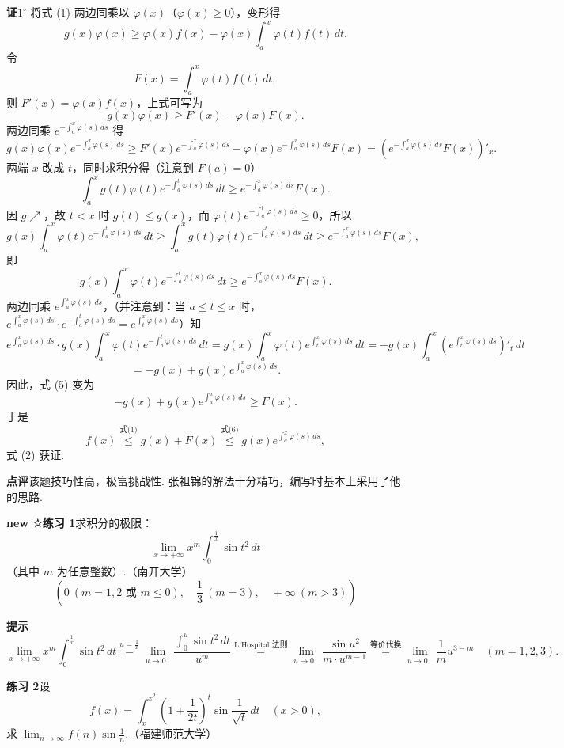 \documentclass[UTF8,12pt,a4paper,fontset=fandol]{ctexart}
\begin{document}
\noindent\textbf{证}\quad $1^\circ$ 将式 (1) 两边同乘以 $\varphi(x)$（$\varphi(x)\ge0$），变形得
\[
g(x)\varphi(x)\ge \varphi(x)f(x)-\varphi(x)\int_a^x\varphi(t)f(t)\,dt.
\]
令
\[
F(x)=\int_a^x\varphi(t)f(t)\,dt,
\]
则 $F'(x)=\varphi(x)f(x)$，上式可写为
\[
g(x)\varphi(x)\ge F'(x)-\varphi(x)F(x).
\]
两边同乘 $e^{-\int_a^x\varphi(s)\,ds}$ 得
\[
g(x)\varphi(x)e^{-\int_a^x\varphi(s)\,ds}
\ge F'(x)e^{-\int_a^x\varphi(s)\,ds}
-\varphi(x)e^{-\int_a^x\varphi(s)\,ds}F(x)
=\left(e^{-\int_a^x\varphi(s)\,ds}F(x)\right)'_x.
\tag{3}
\]
两端 $x$ 改成 $t$，同时求积分得（注意到 $F(a)=0$）
\[
\int_a^x g(t)\varphi(t)e^{-\int_a^t\varphi(s)\,ds}\,dt
\ge e^{-\int_a^x\varphi(s)\,ds}F(x).
\tag{4}
\]
因 $g\nearrow$，故 $t<x$ 时 $g(t)\le g(x)$，而 $\varphi(t)e^{-\int_a^t\varphi(s)\,ds}\ge0$，所以
\[
g(x)\int_a^x\varphi(t)e^{-\int_a^t\varphi(s)\,ds}\,dt
\ge \int_a^x g(t)\varphi(t)e^{-\int_a^t\varphi(s)\,ds}\,dt
\ge e^{-\int_a^x\varphi(s)\,ds}F(x),
\]
即
\[
g(x)\int_a^x\varphi(t)e^{-\int_a^t\varphi(s)\,ds}\,dt
\ge e^{-\int_a^x\varphi(s)\,ds}F(x).
\tag{5}
\]
两边同乘 $e^{\int_a^x\varphi(s)\,ds}$，（并注意到：当 $a\le t\le x$ 时，$e^{\int_a^x\varphi(s)\,ds}\cdot e^{-\int_a^t\varphi(s)\,ds}=e^{\int_t^x\varphi(s)\,ds}$）知
\[
e^{\int_a^x\varphi(s)\,ds}\cdot g(x)\int_a^x\varphi(t)e^{-\int_a^t\varphi(s)\,ds}\,dt
=g(x)\int_a^x\varphi(t)e^{\int_t^x\varphi(s)\,ds}\,dt
=-g(x)\int_a^x\left(e^{\int_t^x\varphi(s)\,ds}\right)'_t\,dt
\]
\[
=-g(x)+g(x)e^{\int_a^x\varphi(s)\,ds}.
\]
因此，式 (5) 变为
\[
-g(x)+g(x)e^{\int_a^x\varphi(s)\,ds}\ge F(x).
\tag{6}
\]
于是
\[
f(x)\stackrel{\text{式(1)}}{\le}g(x)+F(x)
\stackrel{\text{式(6)}}{\le}g(x)e^{\int_a^x\varphi(s)\,ds},
\]
式 (2) 获证.

\noindent\textbf{点评}\quad 该题技巧性高，极富挑战性. 张祖锦的解法十分精巧，编写时基本上采用了他的思路.

\noindent\textbf{new ☆练习 1}\quad 求积分的极限：
\[
\lim_{x\to+\infty}x^m\int_0^{\frac1x}\sin t^2\,dt
\]
（其中 $m$ 为任意整数）.（南开大学）
\[
\left(0\ (m=1,2\text{ 或 }m\le0),\quad \frac13\ (m=3),\quad +\infty\ (m>3)\right)
\]

\noindent\textbf{提示}\quad
\[
\lim_{x\to+\infty}x^m\int_0^{\frac1x}\sin t^2\,dt
\overset{u=\frac1x}{=}
\lim_{u\to0^+}\frac{\int_0^u\sin t^2\,dt}{u^m}
\overset{\text{L'Hospital 法则}}{=}
\lim_{u\to0^+}\frac{\sin u^2}{m\cdot u^{m-1}}
\overset{\text{等价代换}}{=}
\lim_{u\to0^+}\frac1m u^{3-m}\quad(m=1,2,3).
\]

\noindent\textbf{练习 2}\quad 设
\[
f(x)=\int_x^{x^2}\left(1+\frac1{2t}\right)^t\sin\frac1{\sqrt{t}}\,dt\quad(x>0),
\]
求 $\lim_{n\to\infty}f(n)\sin\frac1n$.（福建师范大学）
\end{document}
